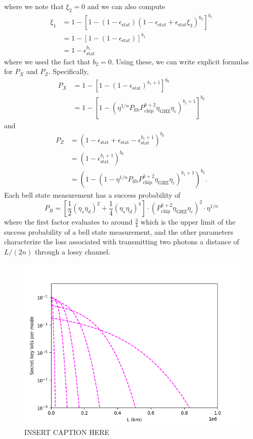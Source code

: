 \documentclass[%
 reprint,
 amsmath,amssymb
 aps,
]{revtex4}
\theoremstyle{remark}
\begin{document}
where we note that $\xi_2 = 0$ and we can also compute 
\begin{align}
    \xi_1 &= 1 - [1 - (1-\epsilon_\text{stat})(1-\epsilon_\text{stat}+\epsilon_\text{stat}\xi_3)^{b_2}]^{b_1} \\ 
    &= 1 - [1 - (1-\epsilon_\text{stat})]^{b_1} \\ 
    &= 1 - \epsilon_\text{stat}^{b_1}
\end{align}
where we used the fact that $b_2=0.$ Using these, we can write explicit formulas for $P_X$ and $P_Z.$ Specifically,
\begin{align}
    P_X &= 1 - [1-(1-\epsilon_\text{stat})^{b_1+1}]^{b_0} \\ 
    &= 1 - [1-(\eta^{1/n}P_\text{fib}P_\text{chip}^{k+2}\eta_\text{GHZ}\eta_c)^{b_1+1}]^{b_0}
\end{align}
and 
\begin{align}
    P_Z &= (1 - \epsilon_\text{stat} + \epsilon_\text{stat} - \epsilon_\text{stat}^{b_1+1})^{b_0} \\ 
    &= (1 - \epsilon_\text{stat}^{b_1+1})^{b_0} \\ 
    &= \left(1 - \left(1-\eta^{1/n}P_\text{fib}P_\text{chip}^{k+2}\eta_\text{GHZ}\eta_c\right)^{b_1+1}\right)^{b_0}.
\end{align}
Each bell state measurement has a success probability of 
\begin{equation}
    P_B = \left[\frac{1}{2}(\eta_s\eta_d)^2 + \frac{1}{4}(\eta_s\eta_d)^4\right] \cdot \left(P_\text{chip}^{k+2}\eta_\text{GHZ}\eta_c\right)^2 \cdot \eta^{1/n}
\end{equation} 
where the first factor evaluates to around $\frac{3}{4}$ which is the upper limit of the success probability of a bell state measurement, and the other parameters characterize the loss associated with transmitting two photons a distance of $L/(2n)$ through a lossy channel.
\begin{figure}[h!]
    \centering
    \includegraphics[width=0.6\linewidth]{figs/e_graph.png} 
    \caption{INSERT CAPTION HERE}
    \label{fig:e_caption}
\end{figure}
\end{document}
